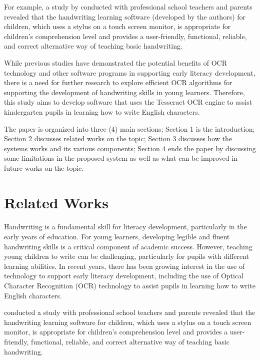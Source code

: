 \documentclass[twocolumn,oneside,12pt,a4paper]{article}
\begin{document}
For example, a study by \cite{alvaro_basic_2010} conducted with professional school teachers and parents revealed that the handwriting learning software (developed by the authors) for children, which uses a stylus on a touch screen monitor, is appropriate for children's comprehension level and provides a user-friendly, functional, reliable, and correct alternative way of teaching basic handwriting.

While previous studies have demonstrated the potential benefits of OCR technology and other software programs in supporting early literacy development, there is a need for further research to explore efficient OCR algorithms for supporting the development of handwriting skills in young learners. Therefore, this study aims to develop software that uses the Tesseract OCR engine \cite{smith_overview_2007} to assist kindergarten pupils in learning how to write English characters.

The paper is organized into three (4) main sections; Section 1 is the introduction; Section 2 discusses related works on the topic; Section 3 discusses how the systems works and its various components; Section 4 ends the paper by discussing some limitations in the proposed system as well as what can be improved in future works on the topic.

\section{Related Works}
\paragraph*{}
Handwriting is a fundamental skill for literacy development, particularly in the early years of education. For young learners, developing legible and fluent handwriting skills is a critical component of academic success. However, teaching young children to write can be challenging, particularly for pupils with different learning abilities. In recent years, there has been growing interest in the use of technology to support early literacy development, including the use of Optical Character Recognition (OCR) technology to assist pupils in learning how to write English characters.

\cite{alvaro_basic_2010} conducted a study with professional school teachers and parents revealed that the handwriting learning software for children, which uses a stylus on a touch screen monitor, is appropriate for children's comprehension level and provides a user-friendly, functional, reliable, and correct alternative way of teaching basic handwriting.
\end{document}

